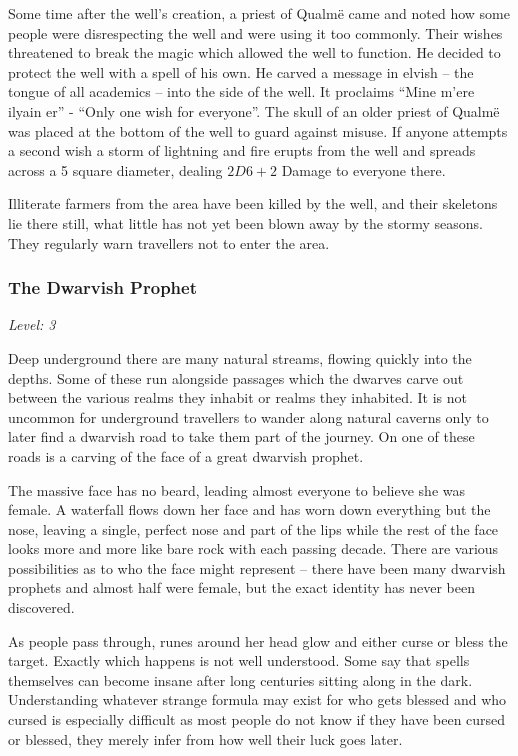 Some time after the well's creation, a priest of Qualm\"{e} came and noted how some people were disrespecting the well and were using it too commonly.  Their wishes threatened to break the magic which allowed the well to function.  He decided to protect the well with a spell of his own.  He carved a message in elvish -- the tongue of all academics -- into the side of the well.  It proclaims ``Mine m'{e}re ilyain er'' - ``Only one wish for everyone''.  The skull of an older priest of Qualm\"{e} was placed at the bottom of the well to guard against misuse.  If anyone attempts a second wish a storm of lightning and fire erupts from the well and spreads across a 5 square diameter, dealing $2D6+2$ Damage to everyone there.

Illiterate farmers from the area have been killed by the well, and their skeletons lie there still, what little has not yet been blown away by the stormy seasons.  They regularly warn travellers not to enter the area.

\subsubsection{The Dwarvish Prophet}

\textit{Level: 3}

Deep underground there are many natural streams, flowing quickly into the depths.  Some of these run alongside passages which the dwarves carve out between the various realms they inhabit or realms they inhabited.  It is not uncommon for underground travellers to wander along natural caverns only to later find a dwarvish road to take them part of the journey.  On one of these roads is a carving of the face of a great dwarvish prophet.

The massive face has no beard, leading almost everyone to believe she was female.  A waterfall flows down her face and has worn down everything but the nose, leaving a single, perfect nose and part of the lips while the rest of the face looks more and more like bare rock with each passing decade.  There are various possibilities as to who the face might represent -- there have been many dwarvish prophets and almost half were female, but the exact identity has never been discovered.

As people pass through, runes around her head glow and either curse or bless the target.  Exactly which happens is not well understood.  Some say that spells themselves can become insane after long centuries sitting along in the dark.  Understanding whatever strange formula may exist for who gets blessed and who cursed is especially difficult as most people do not know if they have been cursed or blessed, they merely infer from how well their luck goes later.

